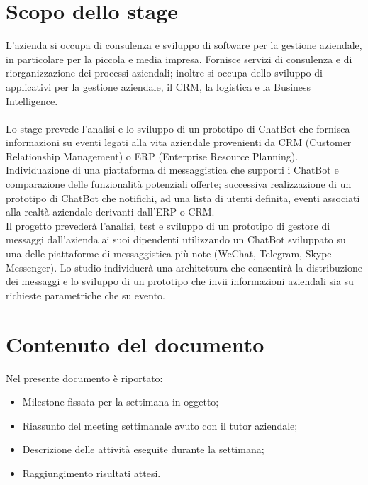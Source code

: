 \documentclass[11pt,notitlepage]{article}
\begin{document}
\section*{Scopo dello stage}

L’azienda si occupa di consulenza e sviluppo di software per la gestione aziendale, in particolare per la piccola
e media impresa. Fornisce servizi di consulenza e di riorganizzazione dei processi aziendali; inoltre si occupa
dello sviluppo di applicativi per la gestione aziendale, il CRM, la logistica e la Business Intelligence. \\ \\
Lo stage prevede l’analisi e lo sviluppo di un prototipo di ChatBot che fornisca informazioni su eventi legati alla
vita aziendale provenienti da CRM (Customer Relationship Management) o ERP (Enterprise Resource Planning). \\
Individuazione di una piattaforma di messaggistica che supporti i ChatBot e comparazione delle funzionalità
potenziali offerte; successiva realizzazione di un prototipo di ChatBot che notifichi, ad una lista di utenti definita,
eventi associati alla realtà aziendale derivanti dall’ERP o CRM. \\
Il progetto prevederà l’analisi, test e sviluppo di un prototipo di gestore di messaggi dall’azienda ai suoi dipendenti
utilizzando un ChatBot sviluppato su una delle piattaforme di messaggistica più note (WeChat, Telegram, Skype
Messenger). Lo studio individuerà una architettura che consentirà la distribuzione dei messaggi e lo sviluppo di
un prototipo che invii informazioni aziendali sia su richieste parametriche che su evento.

\bigskip
\section*{Contenuto del documento}
Nel presente documento è riportato: 
\begin{itemize}
		\item Milestone fissata per la settimana in oggetto;
		\item Riassunto del meeting settimanale avuto con il tutor aziendale;
		\item Descrizione delle attività eseguite durante la settimana;
		\item Raggiungimento risultati attesi.
	\end{itemize} 

\newpage
\end{document}
